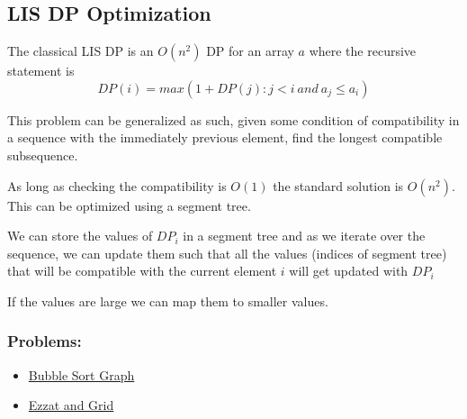 \subsection{LIS DP Optimization}
The classical LIS DP is an $O(n^2)$ DP for an array $a$ where the recursive statement is 
\begin{equation}
DP(i) =  max(1 + DP(j) : j < i \ and  \ a_j\leq a_i) 
\end{equation}

This problem can be generalized as such, given some condition of compatibility in a sequence with the immediately previous element, find the longest compatible subsequence.

As long as checking the compatibility is $O(1)$ the standard solution is $O(n^2)$. This can be optimized using a segment tree.

We can store the values of $DP_i$ in a segment tree and as we iterate over the sequence, we can update them such that all the values (indices of segment tree) that will be compatible with the current element $i$ will get updated with $DP_i$

If the values are large we can map them to smaller values. 

\subsubsection{Problems:}
\begin{itemize}
	\item \href{https://codeforces.com/contest/340/problem/D}{Bubble Sort Graph}
	\item \href{https://codeforces.com/contest/1557/problem/D}{Ezzat and Grid}
\end{itemize}
